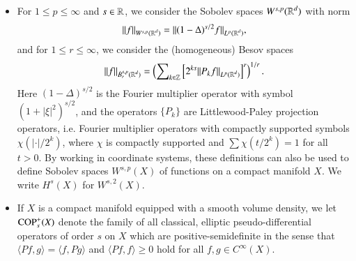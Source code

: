 \begin{itemize}
    \item For $1 \leq p \leq \infty$ and $s \in \operatorname{\mathbb{R}}$, we consider the Sobolev spaces $W^{s,p}(\operatorname{\mathbb{R}}^d)$ with norm
    \[ \| f \|_{W^{s,p}(\operatorname{\mathbb{R}}^d)} = \| (1-\Delta)^{s/2} f \|_{L^p(\operatorname{\mathbb{R}}^d)}, \]
    and for $1 \leq r \leq \infty$, we consider the (homogeneous) Besov spaces
    \[ \| f \|_{\dot{B}^{s,p}_r(\operatorname{\mathbb{R}}^d)} = \left( \sum\nolimits_{k \in \operatorname{\mathbb{Z}}} \left[ 2^{ks} \| P_k f \|_{L^p(\operatorname{\mathbb{R}}^d)} \right]^r \right)^{1/r}. \]
    Here $(1 - \Delta)^{s/2}$ is the Fourier multiplier operator with symbol $(1 + |\xi|^2)^{s/2}$, and the operators $\{ P_k \}$ are Littlewood-Paley projection operators, i.e. Fourier multiplier operators with compactly supported symbols $\chi( |\cdot| / 2^k )$, where $\chi$ is compactly supported and $\sum \chi(t/2^k) = 1$ for all $t > 0$. By working in coordinate systems, these definitions can also be used to define Sobolev spaces $W^{s,p}(X)$ of functions on a compact manifold $X$. We write $H^s(X)$ for $W^{s,2}(X)$.

    \item If $X$ is a compact manifold equipped with a smooth volume density, we let ${\text{COP}^{+}_{{s}}}(X)$ denote the family of all classical, elliptic pseudo-differential operators of order $s$ on $X$ which are positive-semidefinite in the sense that $\langle Pf, g \rangle = \langle f, Pg \rangle$ and $\langle Pf, f \rangle \geq 0$ hold for all $f,g \in C^\infty(X)$.
\end{itemize}